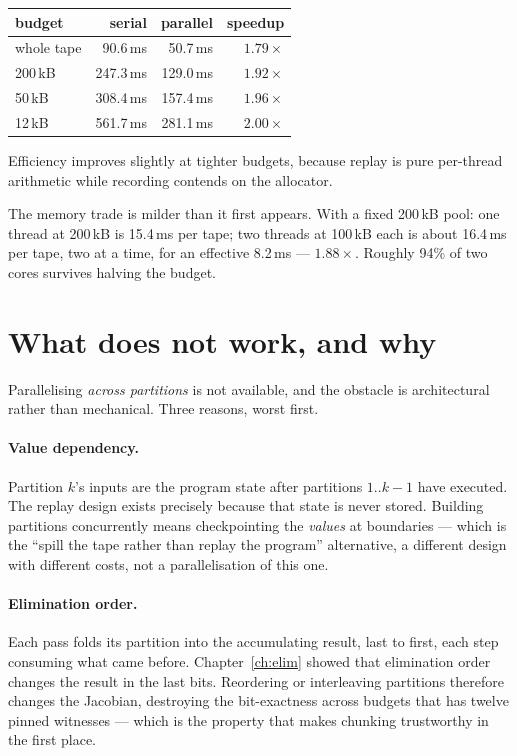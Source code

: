 \documentclass[11pt,a4paper]{report}
\begin{document}
\begin{center}
\begin{tabular}{@{}lrrr@{}}
\toprule
budget & serial & parallel & speedup \\
\midrule
whole tape & 90.6\,ms & 50.7\,ms & $1.79\times$ \\
200\,kB    & 247.3\,ms & 129.0\,ms & $1.92\times$ \\
50\,kB     & 308.4\,ms & 157.4\,ms & $1.96\times$ \\
12\,kB     & 561.7\,ms & 281.1\,ms & $2.00\times$ \\
\bottomrule
\end{tabular}
\end{center}

\noindent
Efficiency improves slightly at tighter budgets, because replay is pure
per-thread arithmetic while recording contends on the allocator.

The memory trade is milder than it first appears. With a fixed 200\,kB pool: one
thread at 200\,kB is 15.4\,ms per tape; two threads at 100\,kB each is about
16.4\,ms per tape, two at a time, for an effective 8.2\,ms --- $1.88\times$.
Roughly 94\% of two cores survives halving the budget.

\section{What does not work, and why}

Parallelising \emph{across partitions} is not available, and the obstacle is
architectural rather than mechanical. Three reasons, worst first.

\paragraph{Value dependency.} Partition $k$'s inputs are the program state after
partitions $1..k-1$ have executed. The replay design exists precisely because
that state is never stored. Building partitions concurrently means checkpointing
the \emph{values} at boundaries --- which is the ``spill the tape rather than
replay the program'' alternative, a different design with different costs, not a
parallelisation of this one.

\paragraph{Elimination order.} Each pass folds its partition into the
accumulating result, last to first, each step consuming what came before.
Chapter~\ref{ch:elim} showed that elimination order changes the result in the
last bits. Reordering or interleaving partitions therefore changes the Jacobian,
destroying the bit-exactness across budgets that has twelve pinned witnesses ---
which is the property that makes chunking trustworthy in the first place.
\end{document}
